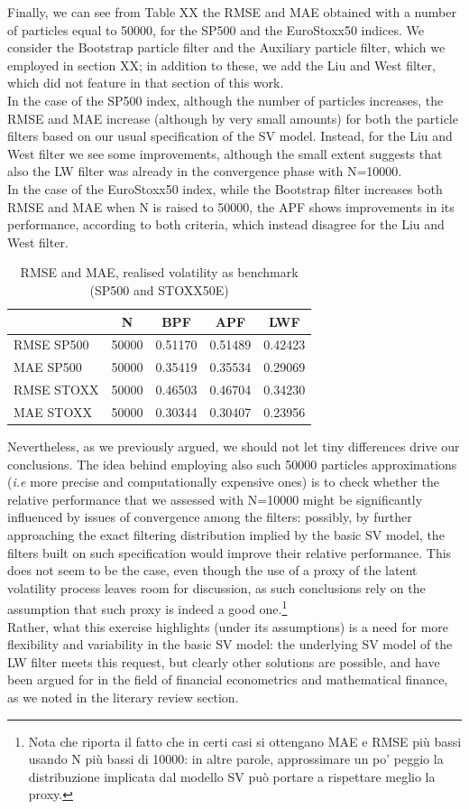 \documentclass[
]{book}
\theoremstyle{break}
\theoremstyle{nonumberplain}
\begin{document}
Finally, we can see from Table XX the RMSE and MAE obtained with a
number of particles equal to 50000, for the SP500 and the EuroStoxx50
indices. We consider the Bootstrap particle filter and the Auxiliary
particle filter, which we employed in section XX; in addition to these,
we add the Liu and West filter, which did not feature in that section of
this work.\\
In the case of the SP500 index, although the number of particles
increases, the RMSE and MAE increase (although by very small amounts)
for both the particle filters based on our usual specification of the SV
model. Instead, for the Liu and West filter we see some improvements,
although the small extent suggests that also the LW filter was already
in the convergence phase with N=10000.\\
In the case of the EuroStoxx50 index, while the Bootstrap filter
increases both RMSE and MAE when N is raised to 50000, the APF shows
improvements in its performance, according to both criteria, which
instead disagree for the Liu and West filter.

\begin{longtable}[t]{lcccc}
\caption{\label{tab:unnamed-chunk-44}RMSE and MAE, realised volatility as benchmark (SP500 and STOXX50E)}\\
\toprule
  & N & BPF & APF & LWF\\
\midrule
RMSE SP500 & 50000 & 0.51170 & 0.51489 & 0.42423\\
MAE SP500 & 50000 & 0.35419 & 0.35534 & 0.29069\\
RMSE STOXX & 50000 & 0.46503 & 0.46704 & 0.34230\\
MAE STOXX & 50000 & 0.30344 & 0.30407 & 0.23956\\
\bottomrule
\end{longtable}

Nevertheless, as we previously argued, we should not let tiny
differences drive our conclusions. The idea behind employing also such
50000 particles approximations (\textit{i.e} more precise and
computationally expensive ones) is to check whether the relative
performance that we assessed with N=10000 might be significantly
influenced by issues of convergence among the filters: possibly, by
further approaching the exact filtering distribution implied by the
basic SV model, the filters built on such specification would improve
their relative performance. This does not seem to be the case, even
though the use of a proxy of the latent volatility process leaves room
for discussion, as such conclusions rely on the assumption that such
proxy is indeed a good
one.\footnote{Nota che riporta il fatto che in certi casi si ottengano MAE e RMSE più bassi usando N più bassi di 10000: in altre parole, approssimare un po' peggio la distribuzione implicata dal modello SV può portare a rispettare meglio la proxy.}\\
Rather, what this exercise highlights (under its assumptions) is a need
for more flexibility and variability in the basic SV model: the
underlying SV model of the LW filter meets this request, but clearly
other solutions are possible, and have been argued for in the field of
financial econometrics and mathematical finance, as we noted in the
literary review section.
\end{document}
